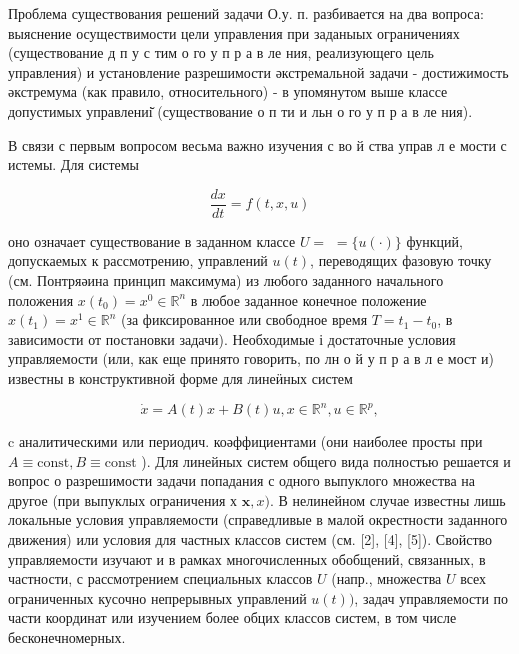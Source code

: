 \documentclass[10pt]{article}
\begin{document}
Проблема существования решений задачи О.у. п. разбивается на два вопроса: выяснение осуществимости цели управления при заданыых ограничениях (существование д п у с тим о го у п р а в ле ния, реализующего цель управления) и установление разрешимости әкстремальной задачи - достижимость әкстремума (как правило, относительного) - в упомянутом выше классе допустимых управлениі̆ (существование о п ти и льн о го у п р а в ле ния).



В связи с первым вопросом весьма важно изучения с во й ства управ л е мости с истемы. Для системы



\[

\frac{d x}{d t}=f(t, x, u)

\]



оно означает существование в заданном классе $U=$ $=\{u(\cdot)\}$ функций, допускаемых к рассмотрению, управлений $u(t)$, переводящих фазовую точку (см. Понтряәина принцип максимума) из любого заданного начального положения $x\left(t_{0}\right)=x^{0} \in \mathbb{R}^{n}$ в любое заданное конечное положение $x\left(t_{1}\right)=x^{1} \in \mathbb{R}^{n}$ (за фиксированное или свободное время $T=t_{1}-t_{0}$, в зависимости от постановки задачи). Необходимые і достаточные условия управляемости (или, как еще принято говорить, по лн о й у п р а в л е мост и) известны в конструктивной форме для линеӥных систем



\[

\dot{x}=A(t) x+B(t) u, x \in \mathbb{R}^{n}, u \in \mathbb{R}^{p},

\]



c аналитическими или периодич. коәффициентами (они наиболее просты при $A \equiv \mathrm{const}, B \equiv \mathrm{const}$ ). Для линейных систем общего вида полностью решается и вопрос о разрешимости задачи попадания с одного выпуклого множества на другое (при выпуклых ограничения х $\mathbf{x}, x)$. В нелинейном случае известны лишь локальные условия управляемости (справедливые в малой окрестности заданного движения) или условия для частных классов систем (см. [2], [4], [5]). Свойство управляемости изучают и в рамках многочисленных обобщений, связанных, в частности, с рассмотрением специальных классов $U$ (напр., множества $U$ всех ограниченных кусочно непрерывных управлений $u(t))$, задач управляемости по части координат или изучением более обцих классов систем, в том числе бесконечномерных.
\end{document}
